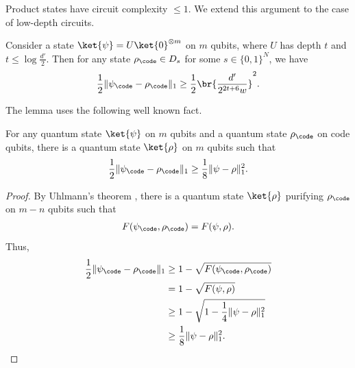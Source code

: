 \documentclass{toc}
\begin{document}
Product states have circuit complexity $\leq 1$. We extend this argument to the case of low-depth circuits.
%
\begin{lemma}
\label{lem:lowdepthunc}
Consider a state $\ket{\psi}= U\ket{0}^{\otimes m}$ on $m$ qubits, where $U$ has depth $t$ and $t\leq \log\frac{d'}{2}$. Then for any state $\rho_{\code}\in D_{s}$ for some $s\in \{0,1\}^N$, we have \begin{align}\frac{1}{2}\|\psi_{\code}-\rho_{\code}\|_1\geq \frac{1}{2}\br{\frac{d'}{2^{2t+6}w}}^2.
\end{align}
\end{lemma}
The lemma uses the following well known fact.
\begin{fact}
\label{fact:uhlmann}
For any quantum state $\ket{\psi}$ on $m$ qubits and a quantum state $\rho_{\code}$ on code qubits, there is a quantum state $\ket{\rho}$ on $m$ qubits such that
\begin{align}\frac{1}{2}\|\psi_{\code}-\rho_{\code}\|_1\geq \frac{1}{8}\|\psi-\rho\|^2_1.\end{align}
\end{fact}
\begin{proof}
By Uhlmann's theorem \cite{uhlmann76}, there is a quantum state $\ket{\rho}$ purifying $\rho_{\code}$ on $m-n$ qubits such that
\begin{align}F(\psi_{\code}, \rho_{\code})=F(\psi,\rho).\end{align}
Thus,
\begin{align}
\frac{1}{2}\|\psi_{\code}-\rho_{\code}\|_1 &\geq 1-\sqrt{F(\psi_{\code},\rho_{\code})} \\
&=1-\sqrt{F(\psi,\rho)} \\
&\geq 1-\sqrt{1-\frac{1}{4}\|\psi-\rho\|^2_1} \\
&\geq \frac{1}{8}\|\psi-\rho\|^2_1.
\end{align}
\end{proof}
\end{document}

